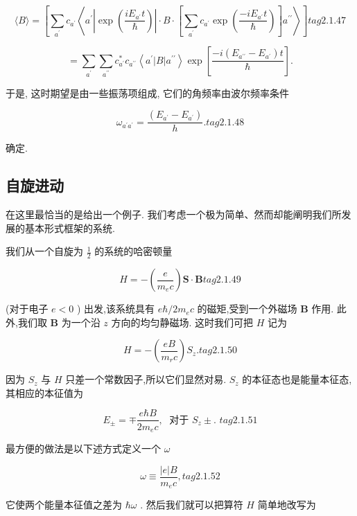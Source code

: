 \documentclass[lang=cn,newtx,10pt,scheme=chinese,thmcnt=section]{elegantbook}
\begin{document}
$$
\langle B\rangle = \left\lbrack {\mathop{\sum }\limits_{{a}^{\prime }}{c}_{{a}^{\prime }}\left\langle {{a}^{\prime }\left| {\exp \left( \frac{i{E}_{{a}^{\prime }}t}{\hbar }\right) }\right| \cdot B \cdot \left\lbrack {\mathop{\sum }\limits_{{a}^{\prime }}{c}_{{a}^{\prime }}\exp \left( \frac{-i{E}_{{a}^{\prime }}t}{\hbar }\right) }\right\rbrack {a}^{\prime \prime }}\right\rangle }\right\rbrack tag{2.1.47}
$$

$$
= \mathop{\sum }\limits_{{a}^{\prime }}\mathop{\sum }\limits_{{a}^{\prime \prime }}{c}_{{a}^{\prime }}^{ * }{c}_{{a}^{\prime \prime }}\left\langle {{a}^{\prime }\left| B\right| {a}^{\prime \prime }}\right\rangle \exp \left\lbrack \frac{-i\left( {{E}_{{a}^{\prime \prime }} - {E}_{{a}^{\prime }}}\right) t}{\hbar }\right\rbrack .
$$

于是, 这时期望是由一些振荡项组成, 它们的角频率由波尔频率条件

$$
{\omega }_{{a}^{\prime }{a}^{\prime }} = \frac{\left( {E}_{{a}^{\prime }} - {E}_{{a}^{\prime }}\right) }{h}. tag{2.1.48}
$$

确定.

\subsection*{自旋进动}

在这里最恰当的是给出一个例子. 我们考虑一个极为简单、然而却能阐明我们所发展的基本形式框架的系统.

我们从一个自旋为 $\frac{1}{2}$ 的系统的哈密顿量

$$
H = - \left( \frac{e}{{m}_{e}c}\right) \mathbf{S} \cdot \mathbf{B} tag{2.1.49}
$$

(对于电子 $e < 0$ ) 出发,该系统具有 $e\hbar /2{m}_{e}c$ 的磁矩,受到一个外磁场 $\mathbf{B}$ 作用. 此外,我们取 $\mathbf{B}$ 为一个沿 $z$ 方向的均匀静磁场. 这时我们可把 $H$ 记为

$$
H = - \left( \frac{eB}{{m}_{r}c}\right) {S}_{z}. tag{2. 1.50}
$$

因为 ${S}_{z}$ 与 $H$ 只差一个常数因子,所以它们显然对易. ${S}_{z}$ 的本征态也是能量本征态,其相应的本征值为

$$
{E}_{ \pm } = \mp \frac{e\hbar B}{2{m}_{e}c},\;\text{ 对于 }{S}_{z} \pm \text{. } tag{2.1.51}
$$

最方便的做法是以下述方式定义一个 $\omega$

$$
\omega \equiv \frac{\left| e\right| B}{{m}_{e}c}, tag{2.1.52}
$$

它使两个能量本征值之差为 $\hbar \omega$ . 然后我们就可以把算符 $H$ 简单地改写为
\end{document}
